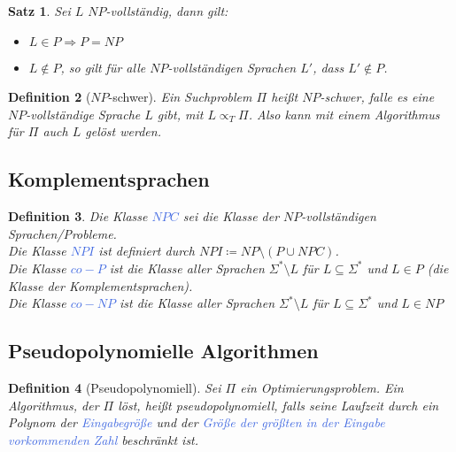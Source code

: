 \documentclass[11pt]{scrartcl}
\newcommand{\tcol}[1]{\textcolor{RoyalBlue}{#1}}
\theoremstyle{break}
\newtheorem{satz}{Satz}[section]
\newtheorem{defi}[satz]{Definition}
\begin{document}
    \begin{satz}
        Sei $L$ $NP$-vollständig, dann gilt:
        \begin{itemize}
            \item $L\in P\Rightarrow P=NP$
            \item $L\notin P$, so gilt für alle $NP$-vollständigen Sprachen $L'$, dass $L'\notin P$.
        \end{itemize}
    \end{satz}


    \begin{defi}[$NP$-schwer]
        Ein Suchproblem $\Pi$ heißt $NP$-schwer, falle es eine $NP$-vollständige Sprache $L$ gibt, mit $L\propto_T\Pi$.
        Also kann mit einem Algorithmus für $\Pi$ auch $L$ gelöst werden.
    \end{defi}


    \subsection{Komplementsprachen}
	\label{subsec:komplementsprachen}

    \begin{defi}
        Die Klasse \tcol{$NPC$} sei die Klasse der $NP$-vollständigen Sprachen/Probleme.\\
        Die Klasse \tcol{$NPI$} ist definiert durch $NPI\coloneqq NP\setminus(P\cup NPC)$.\\
        Die Klasse \tcol{$co-P$} ist die Klasse aller Sprachen $\Sigma^*\setminus L$ für $L\subseteq\Sigma^*$ und $L\in P$ (die Klasse der Komplementsprachen).\\
        Die Klasse \tcol{$co-NP$} ist die Klasse aller Sprachen $\Sigma^*\setminus L$ für $L\subseteq\Sigma^*$ und $L\in NP$
    \end{defi}


    \subsection{Pseudopolynomielle Algorithmen}
    \label{subsec:pseudopolynomielle-algorithmen}

    \begin{defi}[Pseudopolynomiell]
        Sei $\Pi$ ein Optimierungsproblem.
        Ein Algorithmus, der $\Pi$ löst, heißt pseudopolynomiell, falls seine Laufzeit durch ein Polynom der \tcol{Eingabegröße} und der \tcol{Größe der größten in der Eingabe vorkommenden Zahl} beschränkt ist.
    \end{defi}
\end{document}

